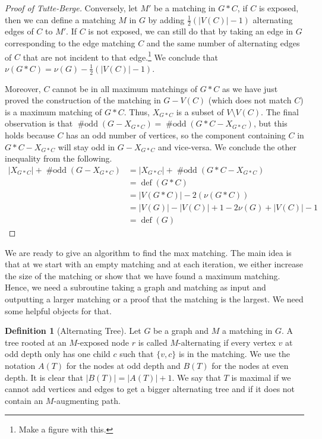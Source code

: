 \documentclass{tufte-handout}
\newcommand{\bra}[1]{\left(#1\right)}
\theoremstyle{definition}
\newtheorem{defn}[thm]{Definition}
\theoremstyle{remark}
\DeclareMathOperator{\odd}{\#odd}
\DeclareMathOperator{\defic}{def}
\begin{document}
\begin{proof}[Proof of Tutte-Berge]
	Conversely, let $M'$ be a matching in $G*C$, if $C$ is exposed, then we can define a matching $M$ in $G$ by adding $\frac{1}{2}(|V(C)|-1)$ alternating edges of $C$ to $M'$. If $C$ is not exposed, we can still do that by taking an edge in $G$ corresponding to the edge matching $C$ and the same number of alternating edges of $C$ that are not incident to that edge.\footnote{Make a figure with this.} We conclude that $\nu(G*C) = \nu(G) - \frac{1}{2}(|V(C)|-1)$.
	
	Moreover, $C$ cannot be in all maximum matchings of $G*C$ as we have just proved the construction of the matching in $G-V(C)$ (which does not match $C$) is a maximum matching of $G*C$. Thus, $X_{G*C}$ is a subset of $V\setminus V(C)$. The final observation is that $\odd\bra{G-X_{G*C}} = \odd\bra{G*C-X_{G*C}}$, but this holds because $C$ has an odd number of vertices, so the component containing $C$ in $G*C-X_{G*C}$ will stay odd in $G-X_{G*C}$ and vice-versa. We conclude the other inequality from the following.	
	\begin{align*}
		|X_{G*C}|+\odd\bra{G-X_{G*C}} &=|X_{G*C}|+\odd\bra{G*C-X_{G*C}}\\&=\defic(G*C)\\&= |V(G*C)| - 2(\nu(G*C))\\
		&= |V(G)| - |V(C)| + 1 - 2\nu(G) + |V(C)| -1\\
		&= \defic(G)
	\end{align*}	
\end{proof}
We are ready to give an algorithm to find the max matching. The main idea is that at we start with an empty matching and at each iteration, we either increase the size of the matching or show that we have found a maximum matching. Hence, we need a subroutine taking a graph and matching as input and outputting a larger matching or a proof that the matching is the largest. We need some helpful objects for that.

\begin{defn}[Alternating Tree]
	Let $G$ be a graph and $M$ a matching in $G$. A tree rooted at an $M$-exposed node $r$ is called $M$-alternating if every vertex $v$ at odd depth only has one child $c$ such that $\{v,c\}$ is in the matching. We use the notation $A(T)$ for the nodes at odd depth and $B(T)$ for the nodes at even depth. It is clear that $|B(T)| = |A(T)| + 1$. We say that $T$ is maximal if we cannot add vertices and edges to get a bigger alternating tree and if it does not contain an $M$-augmenting path.
\end{defn}
\end{document}
